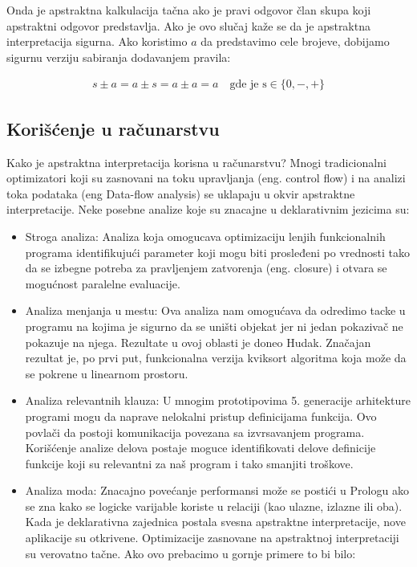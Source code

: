 Onda je apstraktna kalkulacija tačna ako je pravi odgovor član skupa koji apstraktni odgovor predstavlja. Ako je ovo slučaj kaže se da je apstraktna interpretacija sigurna. Ako koristimo $a$ da predstavimo cele brojeve, dobijamo sigurnu verziju sabiranja dodavanjem pravila:

\begin{multline}	
	s \pm a = a \pm s = a \pm a = a \quad \text{gde je s} \in \{0, -, +\}
\end{multline}


\subsection{Korišćenje u računarstvu}
\label{subsec:problem1}
Kako je apstraktna interpretacija korisna u računarstvu? Mnogi tradicionalni optimizatori koji su zasnovani na toku upravljanja (eng. control flow) i na analizi toka podataka (eng Data-flow analysis) se uklapaju u okvir apstraktne interpretacije. Neke posebne analize koje su znacajne u deklarativnim jezicima su:

\begin{itemize}
\item Stroga analiza:
Analiza koja omogucava optimizaciju lenjih  funkcionalnih programa identifikujući parameter koji mogu biti prosleđeni po vrednosti tako da se izbegne potreba za pravljenjem zatvorenja (eng. closure) i otvara se mogućnost paralelne evaluacije. 

\item Analiza menjanja u mestu:
Ova analiza nam omogućava da odredimo tacke u programu na kojima je sigurno da se uništi objekat jer ni jedan pokazivač ne pokazuje na njega. Rezultate u ovoj oblasti je doneo Hudak. Značajan rezultat je, po prvi put, funkcionalna verzija kviksort algoritma koja može da se pokrene u linearnom prostoru. \cite{Girard1987}

\item Analiza relevantnih klauza:
U mnogim prototipovima 5. generacije arhitekture programi mogu da naprave nelokalni pristup definicijama funkcija. Ovo povlači da postoji komunikacija povezana sa izvrsavanjem programa. Korišćenje analize delova postaje moguce identifikovati delove definicije funkcije koji su relevantni za naš program i tako smanjiti troškove.  

\item Analiza moda:
Znacajno povećanje performansi može se postići u Prologu ako se zna kako se logicke varijable koriste u relaciji (kao ulazne, izlazne ili oba).
Kada je deklarativna zajednica postala svesna apstraktne interpretacije, nove aplikacije su otkrivene. Optimizacije zasnovane na apstraktnoj interpretaciji su verovatno tačne. Ako ovo prebacimo u gornje primere to bi bilo:
\end{itemize}

